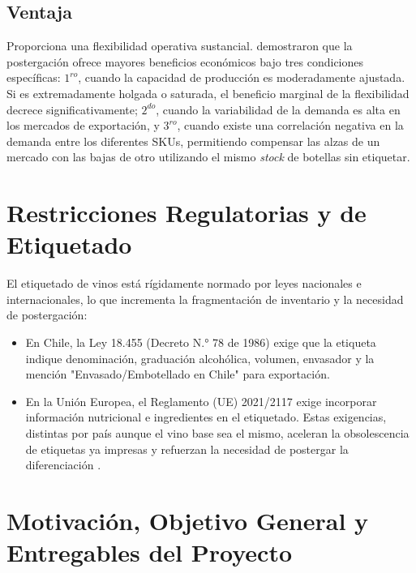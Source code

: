 \subsection{Ventaja\label{sec:sub2_vent}}
Proporciona una flexibilidad operativa sustancial. \cite{varas2018} demostraron que la postergación ofrece mayores beneficios económicos bajo tres condiciones específicas: $1^{ro}$, cuando la capacidad de producción es moderadamente ajustada. Si es extremadamente holgada o saturada, el beneficio marginal de la flexibilidad decrece significativamente; $2^{do}$, cuando la variabilidad de la demanda es alta en los mercados de exportación, y $3^{ro}$, cuando existe una correlación negativa en la demanda entre los diferentes SKUs, permitiendo compensar las alzas de un mercado con las bajas de otro utilizando el mismo \textit{stock} de botellas sin etiquetar.

\section{Restricciones Regulatorias y de Etiquetado\label{sec:sec4}}


El etiquetado de vinos está rígidamente normado por leyes nacionales e internacionales, lo que incrementa la fragmentación de inventario y la necesidad de postergación:

\begin{itemize}
    \item En Chile, la Ley 18.455 (Decreto N.° 78 de 1986) exige que la etiqueta indique denominación, graduación alcohólica, volumen, envasador y la mención "Envasado/Embotellado en Chile" para exportación.
    
    \item En la Unión Europea, el Reglamento (UE) 2021/2117 exige incorporar información nutricional e ingredientes en el etiquetado. Estas exigencias, distintas por país aunque el vino base sea el mismo, aceleran la obsolescencia de etiquetas ya impresas y refuerzan la necesidad de postergar la diferenciación \cite{bouzdine2011,varas2018}.

\end{itemize}

\section{Motivación, Objetivo General y Entregables del Proyecto\label{sec:sec6}}

